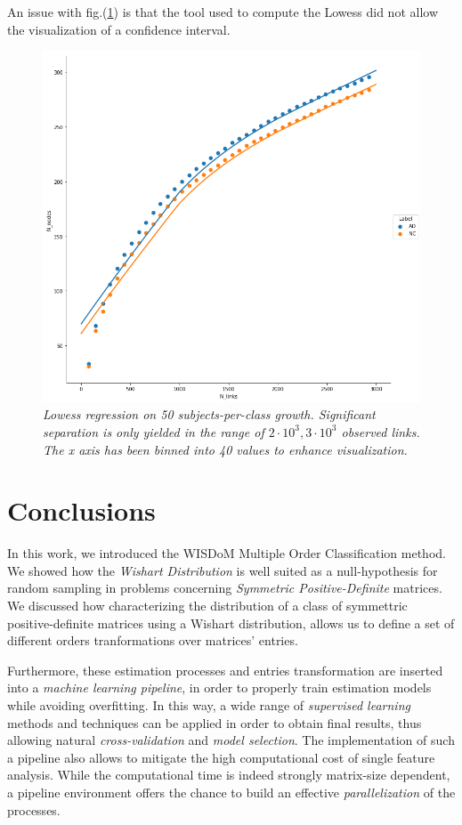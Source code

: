 \documentclass[12pt,openright,twoside,a4paper]{book}
\begin{document}
An issue with fig.(\ref{ADNI-lowess}) is that the tool used to compute the Lowess did not allow the visualization of a confidence interval.

\begin{figure}[!h]
\centering
\includegraphics[scale=0.4]{ADNI-lowess}
\caption{\textit{Lowess regression on 50 subjects-per-class growth. Significant separation is only yielded in the range of $2\cdot 10^3,3\cdot 10^3$ observed links. The x axis has been binned into 40 values to enhance visualization.}}
\label{ADNI-lowess}
\end{figure}


\backmatter


\chapter{Conclusions}

In this work, we introduced the WISDoM Multiple Order Classification method.
We showed how the \textit{Wishart Distribution} is well suited as a null-hypothesis for random sampling in problems concerning \textit{Symmetric Positive-Definite} matrices.
We discussed how characterizing the distribution of a class of symmettric positive-definite matrices using a Wishart distribution, allows us to define a set of different orders tranformations over matrices' entries.

Furthermore, these estimation processes and entries transformation are inserted into a \textit{machine learning pipeline}, in order to properly train estimation models while avoiding overfitting.
In this way, a wide range of \textit{supervised learning} methods and techniques can be applied in order to obtain final results, thus allowing natural \textit{cross-validation} and \textit{model selection}.
The implementation of such a pipeline also allows to mitigate the high computational cost of single feature analysis.
While the computational time is indeed strongly matrix-size dependent, a pipeline environment offers the chance to build an effective \textit{parallelization} of the processes.
\end{document}

